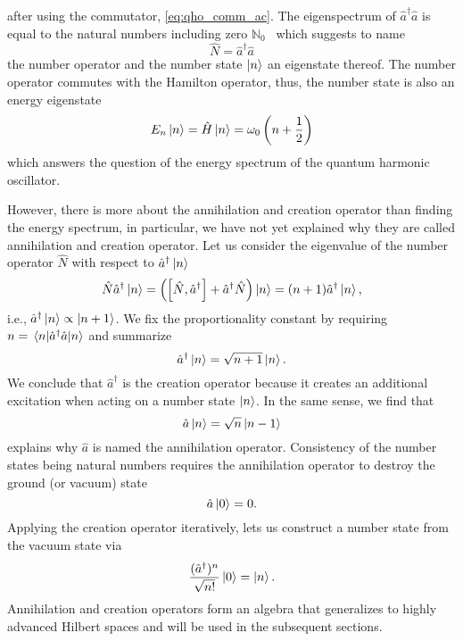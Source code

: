 after using the commutator, \cref{eq:qho_comm_ac}.
The eigenspectrum of $\hat{a}^\dagger\hat{a}$ is equal to the natural numbers including zero $\mathbb{N}_0$~\cite[p.~506]{Cohen2019} which suggests to name
\begin{equation}
    \hat{N}
    =
    \hat{a}^\dagger\hat{a}
    \label{eq:qho_number_operator}
\end{equation}
the number operator and the number state $\ket{n}$ an eigenstate thereof.
The number operator commutes with the Hamilton operator, thus, the number state is also an energy eigenstate
\begin{equation}
    E_n\ket{n}
    =
    \hat{H}\ket{n}
    =
    \omega_0\left(n+\frac{1}{2}\right)
    \label{eq:qho_number_energy}
\end{equation}
which answers the question of the energy spectrum of the quantum harmonic oscillator.

However, there is more about the annihilation and creation operator than finding the energy spectrum, in particular, we have not yet explained why they are called annihilation and creation operator.
Let us consider the eigenvalue of the number operator $\hat{N}$ with respect to $\hat{a}^\dagger\ket{n}$
\begin{equation}
    \hat{N}\hat{a}^\dagger\ket{n}
    =
    \left(\comm{\hat{N}}{\hat{a}^\dagger}+\hat{a}^\dagger\hat{N}\right)\ket{n}
    =
    (n+1)\hat{a}^\dagger\ket{n}
    ,
\end{equation}
i.e., $\hat{a}^\dagger\ket{n}\propto\ket{n+1}$.
We fix the proportionality constant by requiring $n=\expval{\hat{a}^\dagger\hat{a}}{n}$ and summarize
\begin{equation}
    \hat{a}^\dagger\ket{n}
    =
    \sqrt{n+1}\ket{n}
    \label{eq:qho_creation}.
\end{equation}
We conclude that $\hat{a}^\dagger$ is the creation operator because it creates an additional excitation when acting on a number state $\ket{n}$.
In the same sense, we find that
\begin{equation}
    \hat{a}\ket{n}
    =
    \sqrt{n}\ket{n-1}
    \label{eq:qho_annhiliation}
\end{equation}
explains why $\hat{a}$ is named the annihilation operator.
Consistency of the number states being natural numbers requires the annihilation operator to destroy the ground (or vacuum) state
\begin{equation}
    \hat{a}\ket{0}
    =
    0
    \label{eq:qho_vacuum_annihilation}.
\end{equation}
Applying the creation operator iteratively, lets us construct a number state from the vacuum state via
\begin{equation}
    \frac{(\hat{a}^\dagger)^n}{\sqrt{n!}}\ket{0}
    =
    \ket{n}
    \label{eq:qho_creation_number}.
\end{equation}
Annihilation and creation operators form an algebra that generalizes to highly advanced Hilbert spaces and will be used in the subsequent sections.